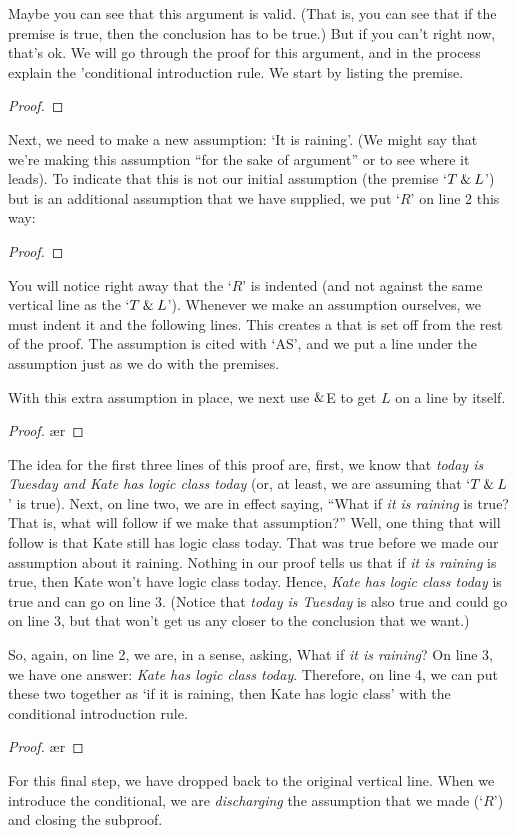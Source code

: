 Maybe you can see that this argument is valid. (That is, you can see that if the premise is true, then the conclusion has to be true.) But if you can't right now, that's ok. We will go through the proof for this argument, and in the process explain the '{conditional introduction rule}. We start by listing the premise.
	\begin{proof}
		 \pr{}
	\end{proof}
Next, we need to make a new assumption: `It is raining'. (We might say that we're making this assumption ``for the sake of argument'' or to see where it leads). To indicate that this is not our initial assumption (the premise `$T \mathbin{\&} L$') but is an additional assumption that we have supplied, we put `$R$' on line 2 this way:
	\begin{proof}
		 \pr{}
		\open
			 \as{}
	\end{proof}
You will notice right away that the `$R$' is indented (and not against the same vertical line as the `$T \mathbin{\&} L$'). Whenever we make an assumption ourselves, we must indent it and the following lines. This creates a  that is set off from the rest of the proof. The assumption is cited with `AS', and we put a line under the assumption just as we do with the premises.

With this extra assumption in place, we next use $\mathbin{\&}$E to get $L$ on a line by itself.
	\begin{proof}
		 \pr{}
		\open
			 \as{}
			\ae{r}
	\end{proof}
The idea for the first three lines of this proof are, first, we know that \textit{today is Tuesday and Kate has logic class today} (or, at least, we are assuming that `$ T \mathbin{\&} L$' is true). Next, on line two, we are in effect saying, ``What if \textit{it is raining} is true? That is, what will follow if we make that assumption?'' Well, one thing that will follow is that Kate still has logic class today. That was true before we made our assumption about it raining. Nothing in our proof tells us that if \textit{it is raining} is true, then Kate won't have logic class today. Hence, \textit{Kate has logic class today} is true and can go on line 3. (Notice that \textit{today is Tuesday} is also true and could go on line 3, but that won't get us any closer to the conclusion that we want.)

So, again, on line 2, we are, in a sense, asking, What if \textit{it is raining}? On line 3, we have one answer: \textit{Kate has logic class today}. Therefore, on line 4, we can put these two together as `if it is raining, then Kate has logic class' with the conditional introduction rule.
	\begin{proof}
		 \pr{}
		\open
			 \as{}
			\ae{r}
			\close
	\end{proof}
For this final step, we have dropped back to the original vertical line. When we introduce the conditional, we are \emph{discharging} the assumption that we made (`$R$') and closing the subproof.

